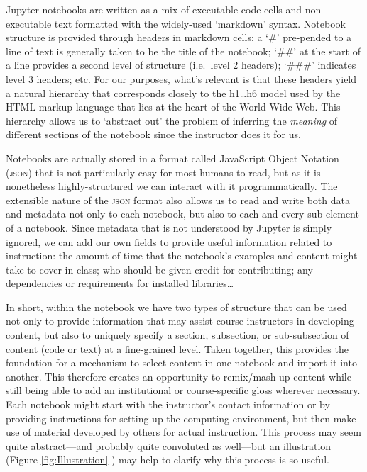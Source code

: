 \documentclass[letter, 11pt]{article}
\newcommand{\ie}{i.e.~\/}
\begin{document}
Jupyter notebooks are written as a mix of executable code cells and non-executable text formatted with the widely-used `markdown' syntax. Notebook structure is provided through headers in markdown cells: a `\#' pre-pended to a line of text is generally taken to be the title of the notebook; `\#\#' at the start of a line provides a second level of structure (\ie level 2 headers); `\#\#\#' indicates level 3 headers; etc. For our purposes, what's relevant is that these headers yield a natural hierarchy that corresponds closely to the h1\ldots{}h6 model used by the HTML markup language that lies at the heart of the World Wide Web. This hierarchy allows us to `abstract out' the problem of inferring the \emph{meaning} of different sections of the notebook since the instructor does it for us. 

Notebooks are actually stored in a format called JavaScript Object Notation (\textsc{json}) that is not particularly easy for most humans to read, but as it is nonetheless highly-structured we can interact with it programmatically. The extensible nature of the \textsc{json} format also allows us to read and write both data and metadata not only to each notebook, but also to each and every sub-element of a notebook. Since metadata that is not understood by Jupyter is simply ignored, we can add our own fields to provide useful information related to instruction: the amount of time that the notebook's examples and content might take to cover in class; who should be given credit for contributing; any dependencies or requirements for installed libraries\ldots 

In short, within the notebook we have two types of structure that can be used not only to provide information that may assist course instructors in developing content, but also to uniquely specify a section, subsection, or sub-subsection of content (code or text) at a fine-grained level. Taken together, this provides the foundation for a mechanism to select content in one notebook and import it into another. This therefore creates an opportunity to remix/mash up content while still being able to add an institutional or course-specific gloss wherever necessary. Each notebook might start with the instructor's contact information or by providing instructions for setting up the computing environment, but then make use of material developed by others for actual instruction. This process may seem quite abstract---and probably quite convoluted as well---but an illustration (Figure \ref{fig:Illustration} ) may help to clarify why this process is so useful.
\end{document}
